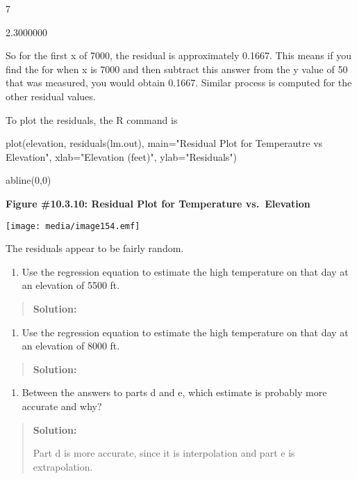 \documentclass[]{book}
\providecommand{\tightlist}{%
  \setlength{\itemsep}{0pt}\setlength{\parskip}{0pt}}
\begin{document}
7

2.3000000

So for the first x of 7000, the residual is approximately 0.1667. This
means if you find the for when x is 7000 and then subtract this answer
from the y value of 50 that was measured, you would obtain 0.1667.
Similar process is computed for the other residual values.

To plot the residuals, the R command is

plot(elevation, residuals(lm.out), main="Residual Plot for Temperautre
vs Elevation", xlab="Elevation (feet)", ylab="Residuals")

abline(0,0)

\textbf{Figure \#10.3.10: Residual Plot for Temperature vs.~Elevation}

\texttt{[image: media/image154.emf]}

The residuals appear to be fairly random.

\begin{enumerate}
\def\labelenumi{\alph{enumi}.}
\setcounter{enumi}{3}
\tightlist
\item
  Use the regression equation to estimate the high temperature on that
  day at an elevation of 5500 ft.
\end{enumerate}

\begin{quote}
\textbf{Solution:}
\end{quote}

\begin{enumerate}
\def\labelenumi{\alph{enumi}.}
\setcounter{enumi}{4}
\tightlist
\item
  Use the regression equation to estimate the high temperature on that
  day at an elevation of 8000 ft.
\end{enumerate}

\begin{quote}
\textbf{Solution:}
\end{quote}

\begin{enumerate}
\def\labelenumi{\alph{enumi}.}
\setcounter{enumi}{5}
\tightlist
\item
  Between the answers to parts d and e, which estimate is probably
  more accurate and why?
\end{enumerate}

\begin{quote}
\textbf{Solution:}

Part d is more accurate, since it is interpolation and part e is
extrapolation.
\end{quote}
\end{document}
